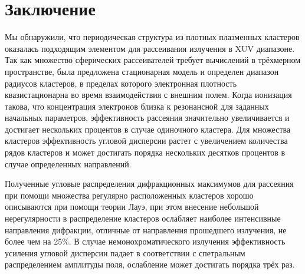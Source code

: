 \section{Заключение}

Мы обнаружили, что периодическая структура из плотных плазменных кластеров оказалась подходящим элементом для рассеивания излучения в XUV диапазоне. Так как множество сферических рассеивателей требует вычислений в трёхмерном пространстве, была предложена стационарная модель и определен диапазон радиусов кластеров, в пределах которого электронная плотность квазистационарна во время взаимодействия с внешним полем. Когда ионизация такова, что концентрация электронов близка к резонансной для заданных начальных параметров, эффективность рассеяния значительно увеличивается и достигает нескольких процентов в случае одиночного кластера. Для множества кластеров эффективность угловой дисперсии растет с увеличением количества рядов кластеров и может достигать порядка нескольких десятков процентов в случае определенных направлений. 

Полученные угловые распределения дифракционных максимумов для рассеяния при помощи множества регулярно расположенных кластеров хорошо описываются при помощи теории Лауэ, при этом внесение небольшой нерегулярности в распределение кластеров ослабляет наиболее интенсивные направления дифракции, отличные от направления прошедшего излучения, не более чем на 25\%. В случае немонохроматического излучения эффективность усиления угловой дисперсии падает в соответствии с спетральным распределением амплитуды поля, ослабление может достигать порядка трёх раз.